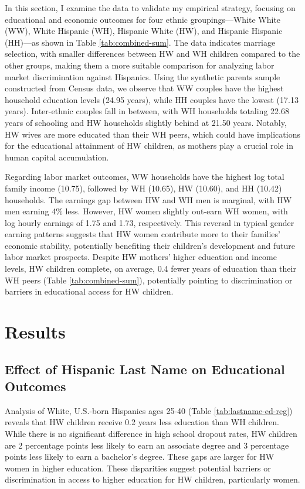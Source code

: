 \documentclass[a4paper,fleqn]{cas-sc}
\begin{document}
In this section, I examine the data to validate my empirical strategy, focusing on educational and economic outcomes for four ethnic groupings—White White (WW), White Hispanic (WH), Hispanic White (HW), and Hispanic Hispanic (HH)—as shown in Table \ref{tab:combined-sum}. The data indicates marriage selection, with smaller differences between HW and WH children compared to the other groups, making them a more suitable comparison for analyzing labor market discrimination against Hispanics. Using the synthetic parents sample constructed from Census data, we observe that WW couples have the highest household education levels (24.95 years), while HH couples have the lowest (17.13 years). Inter-ethnic couples fall in between, with WH households totaling 22.68 years of schooling and HW households slightly behind at 21.50 years. Notably, HW wives are more educated than their WH peers, which could have implications for the educational attainment of HW children, as mothers play a crucial role in human capital accumulation.

Regarding labor market outcomes, WW households have the highest log total family income (10.75), followed by WH (10.65), HW (10.60), and HH (10.42) households. The earnings gap between HW and WH men is marginal, with HW men earning 4\% less. However, HW women slightly out-earn WH women, with log hourly earnings of 1.75 and 1.73, respectively. This reversal in typical gender earning patterns suggests that HW women contribute more to their families' economic stability, potentially benefiting their children's development and future labor market prospects. Despite HW mothers' higher education and income levels, HW children complete, on average, 0.4 fewer years of education than their WH peers (Table \ref{tab:combined-sum}), potentially pointing to discrimination or barriers in educational access for HW children.

\section{Results}\label{sec:results}

\subsection{Effect of Hispanic Last Name on Educational Outcomes}

Analysis of White, U.S.-born Hispanics ages 25-40 (Table \ref{tab:lastname-ed-reg}) reveals that HW children receive 0.2 years less education than WH children. While there is no significant difference in high school dropout rates, HW children are 2 percentage points less likely to earn an associate degree and 3 percentage points less likely to earn a bachelor's degree. These gaps are larger for HW women in higher education. These disparities suggest potential barriers or discrimination in access to higher education for HW children, particularly women.
\end{document}

